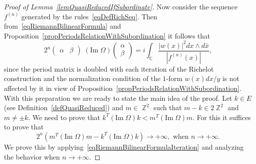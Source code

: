 \documentclass{amsart}
\numberwithin{equation}{section}
\theoremstyle{definition}
\theoremstyle{remark}
\DeclareMathOperator{\CC}{\mathbb C}
\DeclareMathOperator{\ZZ}{\mathbb Z}
\begin{document}
\begin{proof}[Proof of Lemma~\ref{lemQuasiReducedIfSubordinate}]
		Now consider the sequence $f^{(n)}$ generated by the rules~\eqref{eqDefRichSeq}. Then from~\eqref{eqRiemannBilinearFormula} and Proposition~\ref{propPeriodsRelationWithSubordination} it follows that
		\begin{equation}\label{eqRiemannBilinearFormulaIteration}
			2^n\begin{pmatrix}
				\alpha & \beta
			\end{pmatrix} \;(\mathrm{Im}\;\Omega) \begin{pmatrix}
				\alpha \\ \beta
			\end{pmatrix} = i\int_{\CC}\frac{|w(x)|^2dx \wedge d\bar{x}}{|f^{(n)}(x)|},
		\end{equation}
		since the period matrix is doubled with each iteration of the Richelot construction and the normalization condition of the $1$-form $w(x)dx/y$ is not affected by it in view of Proposition~\ref{propPeriodsRelationWithSubordination}. With this preparation we are ready to state the main idea of the proof. Let $k \in E$ (see Definition~\ref{defQuasiReduced}) and $m \in \ZZ^2$ such that $m - k \in 2\ZZ^2$ and $m \ne \pm k$. We need to prove that $k^T (\mathrm{Im}\;\Omega) k < m^T (\mathrm{Im}\;\Omega) m$. For this it suffices to prove that 
		\[
		2^n(m^T (\mathrm{Im}\;\Omega) m - k^T (\mathrm{Im}\;\Omega) k) \to +\infty, \text{ when } n \to +\infty.
		\]
		We prove this by applying~\ref{eqRiemannBilinearFormulaIteration} and analyzing the behavior when $n \to +\infty$.
		

\end{proof}
\end{document}
